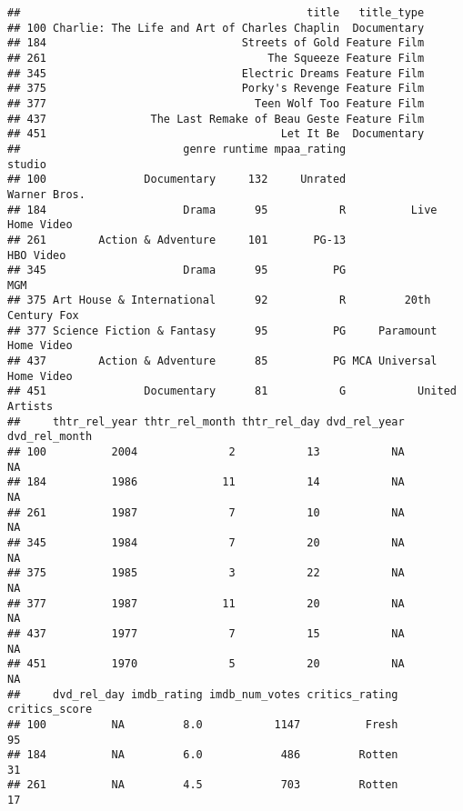 \documentclass[]{article}
\newenvironment{Shaded}{\begin{snugshade}}{\end{snugshade}}
\newcommand{\KeywordTok}[1]{\textcolor[rgb]{0.13,0.29,0.53}{\textbf{#1}}}
\newcommand{\StringTok}[1]{\textcolor[rgb]{0.31,0.60,0.02}{#1}}
\newcommand{\CommentTok}[1]{\textcolor[rgb]{0.56,0.35,0.01}{\textit{#1}}}
\newcommand{\OperatorTok}[1]{\textcolor[rgb]{0.81,0.36,0.00}{\textbf{#1}}}
\newcommand{\NormalTok}[1]{#1}
\begin{document}
\begin{Shaded}
\begin{Highlighting}[]
{{\CommentTok{#DVD realease date}
\NormalTok{movies[}\OperatorTok{!}\KeywordTok{complete.cases}\NormalTok{(movies[}\StringTok{'dvd_rel_year'}\NormalTok{]), ]}
\end{Highlighting}
\end{Shaded}

\begin{verbatim}
##                                            title   title_type
## 100 Charlie: The Life and Art of Charles Chaplin  Documentary
## 184                              Streets of Gold Feature Film
## 261                                  The Squeeze Feature Film
## 345                              Electric Dreams Feature Film
## 375                              Porky's Revenge Feature Film
## 377                                Teen Wolf Too Feature Film
## 437                The Last Remake of Beau Geste Feature Film
## 451                                    Let It Be  Documentary
##                         genre runtime mpaa_rating                   studio
## 100               Documentary     132     Unrated             Warner Bros.
## 184                     Drama      95           R          Live Home Video
## 261        Action & Adventure     101       PG-13                HBO Video
## 345                     Drama      95          PG                      MGM
## 375 Art House & International      92           R         20th Century Fox
## 377 Science Fiction & Fantasy      95          PG     Paramount Home Video
## 437        Action & Adventure      85          PG MCA Universal Home Video
## 451               Documentary      81           G           United Artists
##     thtr_rel_year thtr_rel_month thtr_rel_day dvd_rel_year dvd_rel_month
## 100          2004              2           13           NA            NA
## 184          1986             11           14           NA            NA
## 261          1987              7           10           NA            NA
## 345          1984              7           20           NA            NA
## 375          1985              3           22           NA            NA
## 377          1987             11           20           NA            NA
## 437          1977              7           15           NA            NA
## 451          1970              5           20           NA            NA
##     dvd_rel_day imdb_rating imdb_num_votes critics_rating critics_score
## 100          NA         8.0           1147          Fresh            95
## 184          NA         6.0            486         Rotten            31
## 261          NA         4.5            703         Rotten            17

\end{verbatim}
\end{document}
